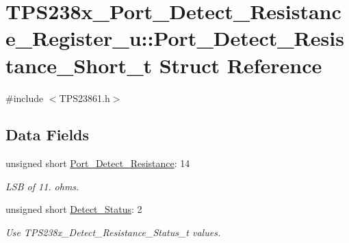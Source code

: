 \hypertarget{struct_t_p_s238x___port___detect___resistance___register__u_1_1_port___detect___resistance___short__t}{\section{T\-P\-S238x\-\_\-\-Port\-\_\-\-Detect\-\_\-\-Resistance\-\_\-\-Register\-\_\-u\-:\-:Port\-\_\-\-Detect\-\_\-\-Resistance\-\_\-\-Short\-\_\-t Struct Reference}
\label{struct_t_p_s238x___port___detect___resistance___register__u_1_1_port___detect___resistance___short__t}
}


{\ttfamily \#include $<$T\-P\-S23861.\-h$>$}

\subsection*{Data Fields}
\begin{DoxyCompactItemize}
\item 
unsigned short \hyperlink{struct_t_p_s238x___port___detect___resistance___register__u_1_1_port___detect___resistance___short__t_a23e6ac5154ca53212af6f59326686b4b}{Port\-\_\-\-Detect\-\_\-\-Resistance}\-: 14
\begin{DoxyCompactList}\small\item\em L\-S\-B of 11. ohms. \end{DoxyCompactList}\item 
unsigned short \hyperlink{struct_t_p_s238x___port___detect___resistance___register__u_1_1_port___detect___resistance___short__t_a9864a22d6e494443ac8834e55457c6f7}{Detect\-\_\-\-Status}\-: 2
\begin{DoxyCompactList}\small\item\em Use T\-P\-S238x\-\_\-\-Detect\-\_\-\-Resistance\-\_\-\-Status\-\_\-t values. \end{DoxyCompactList}\end{DoxyCompactItemize}


